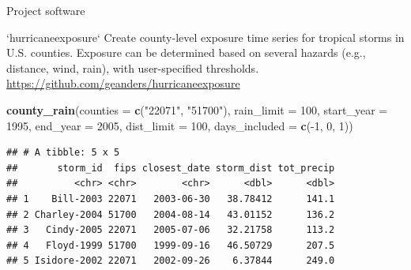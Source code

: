 \documentclass[ignorenonframetext,]{beamer}
\newenvironment{Shaded}{\begin{snugshade}}{\end{snugshade}}
\newcommand{\KeywordTok}[1]{\textcolor[rgb]{0.13,0.29,0.53}{\textbf{{#1}}}}
\newcommand{\DataTypeTok}[1]{\textcolor[rgb]{0.13,0.29,0.53}{{#1}}}
\newcommand{\DecValTok}[1]{\textcolor[rgb]{0.00,0.00,0.81}{{#1}}}
\newcommand{\StringTok}[1]{\textcolor[rgb]{0.31,0.60,0.02}{{#1}}}
\newcommand{\NormalTok}[1]{{#1}}
\begin{document}
\begin{frame}[fragile]{Project software}

\footnotesize

\begin{block}{`hurricaneexposure`}
Create county-level exposure time series for tropical storms in U.S. counties. Exposure can be determined based on several hazards (e.g., distance, wind, rain), with user-specified thresholds. 
\url{https://github.com/geanders/hurricaneexposure}
\end{block}

\begin{Shaded}
\begin{Highlighting}[]
\KeywordTok{county_rain}\NormalTok{(}\DataTypeTok{counties =} \KeywordTok{c}\NormalTok{(}\StringTok{"22071"}\NormalTok{, }\StringTok{"51700"}\NormalTok{), }\DataTypeTok{rain_limit =} \DecValTok{100}\NormalTok{, }
            \DataTypeTok{start_year =} \DecValTok{1995}\NormalTok{, }\DataTypeTok{end_year =} \DecValTok{2005}\NormalTok{, }\DataTypeTok{dist_limit =} \DecValTok{100}\NormalTok{,}
            \DataTypeTok{days_included =} \KeywordTok{c}\NormalTok{(-}\DecValTok{1}\NormalTok{, }\DecValTok{0}\NormalTok{, }\DecValTok{1}\NormalTok{))}
\end{Highlighting}
\end{Shaded}

\begin{verbatim}
## # A tibble: 5 x 5
##       storm_id  fips closest_date storm_dist tot_precip
##          <chr> <chr>        <chr>      <dbl>      <dbl>
## 1    Bill-2003 22071   2003-06-30   38.78412      141.1
## 2 Charley-2004 51700   2004-08-14   43.01152      136.2
## 3   Cindy-2005 22071   2005-07-06   32.21758      113.2
## 4   Floyd-1999 51700   1999-09-16   46.50729      207.5
## 5 Isidore-2002 22071   2002-09-26    6.37844      249.0
\end{verbatim}

\end{frame}
\end{document}
